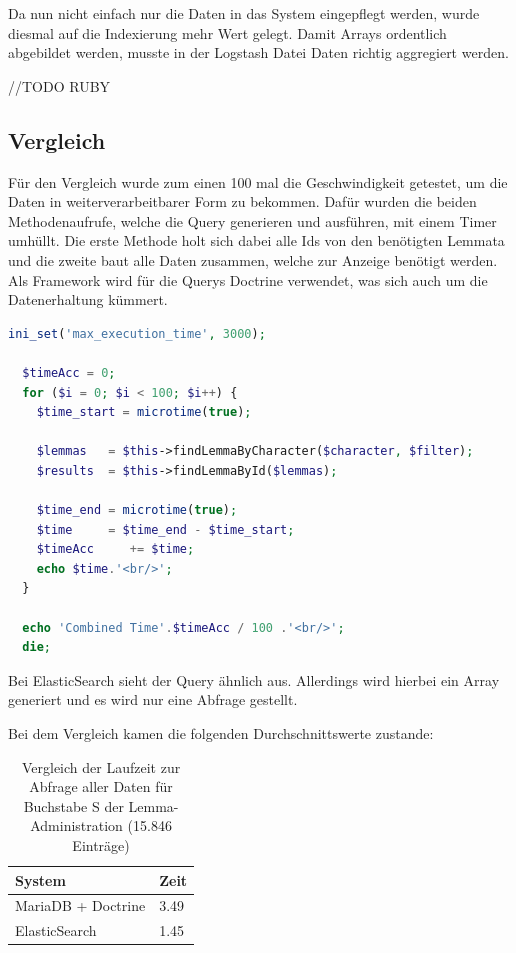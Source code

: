 Da nun nicht einfach nur die Daten in das System eingepflegt werden, wurde diesmal auf die Indexierung mehr Wert gelegt. Damit Arrays ordentlich abgebildet werden, musste in der Logstash Datei Daten richtig aggregiert werden. 


//TODO RUBY


\subsection{Vergleich}

Für den Vergleich wurde zum einen 100 mal die Geschwindigkeit getestet, um die Daten in weiterverarbeitbarer Form zu bekommen.
Dafür wurden die beiden Methodenaufrufe, welche die Query generieren und ausführen, mit einem Timer umhüllt. Die erste Methode holt sich dabei alle Ids von den benötigten Lemmata und die zweite baut alle Daten zusammen, welche zur Anzeige benötigt werden. Als Framework wird für die Querys Doctrine verwendet, was sich auch um die Datenerhaltung kümmert.

\begin{lstlisting}[language=PHP, frame=single, label={lst:vglDb}] 
  ini_set('max_execution_time', 3000);

  $timeAcc = 0;
  for ($i = 0; $i < 100; $i++) {
    $time_start = microtime(true);

    $lemmas   = $this->findLemmaByCharacter($character, $filter);
    $results  = $this->findLemmaById($lemmas);

    $time_end = microtime(true);
    $time     = $time_end - $time_start;
    $timeAcc     += $time;
    echo $time.'<br/>';
  }
  
  echo 'Combined Time'.$timeAcc / 100 .'<br/>';
  die;
\end{lstlisting}

Bei ElasticSearch sieht der Query ähnlich aus. Allerdings wird hierbei ein Array generiert und es wird nur eine Abfrage gestellt. 

Bei dem Vergleich kamen die folgenden Durchschnittswerte zustande:
\begin{table} %
	\centering
		\begin{tabular}{l | l }
		    \textbf{System} & \textbf{Zeit} \\
        \hline
        MariaDB + Doctrine & 3.49 \\
        ElasticSearch      & 1.45  \\
		\end{tabular}
    \caption{Vergleich der Laufzeit zur Abfrage aller Daten für Buchstabe S der Lemma-Administration (15.846 Einträge)}
    \label{vlgTimeDBvsEla}
\end{table}


